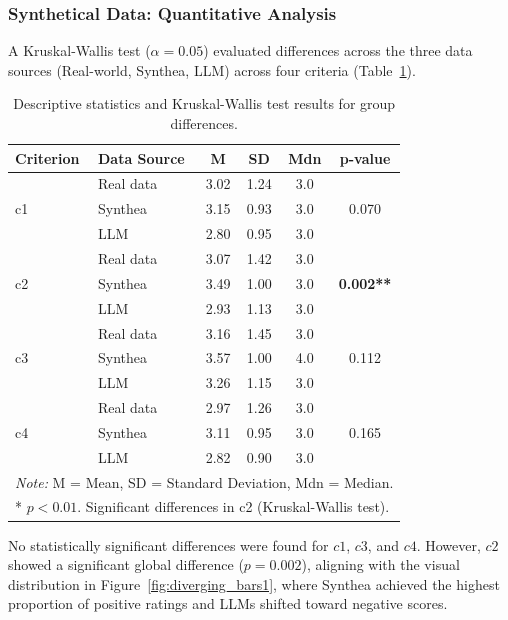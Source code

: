 \subsubsection*{Synthetical Data: Quantitative Analysis}
A Kruskal-Wallis test ($\alpha = 0.05$) evaluated differences across the three data sources (Real-world, Synthea, LLM) across four criteria (Table~\ref{tab:descriptive_stats1}). 
\begin{table}[h!]
\centering
\caption{Descriptive statistics and Kruskal-Wallis test results for group differences.}
\label{tab:descriptive_stats1}
\begin{tabular}{llcccc}
\toprule
\textbf{Criterion} & \textbf{Data Source} & \textbf{M} & \textbf{SD} & \textbf{Mdn} & \textbf{p-value} \\
\midrule
\multirow{3}{*}{c1} & Real data & 3.02 & 1.24 & 3.0 & \multirow{3}{*}{0.070} \\
                    & Synthea    & 3.15 & 0.93 & 3.0 & \\
                    & LLM        & 2.80 & 0.95 & 3.0 & \\
\midrule
\multirow{3}{*}{c2} & Real data & 3.07 & 1.42 & 3.0 & \multirow{3}{*}{\textbf{0.002**}} \\
                    & Synthea    & 3.49 & 1.00 & 3.0 & \\
                    & LLM        & 2.93 & 1.13 & 3.0 & \\
\midrule
\multirow{3}{*}{c3} & Real data & 3.16 & 1.45 & 3.0 & \multirow{3}{*}{0.112} \\
                    & Synthea    & 3.57 & 1.00 & 4.0 & \\
                    & LLM        & 3.26 & 1.15 & 3.0 & \\
\midrule
\multirow{3}{*}{c4} & Real data & 2.97 & 1.26 & 3.0 & \multirow{3}{*}{0.165} \\
                    & Synthea    & 3.11 & 0.95 & 3.0 & \\
                    & LLM        & 2.82 & 0.90 & 3.0 & \\
\bottomrule
\multicolumn{6}{l}{\small \textit{Note:} M = Mean, SD = Standard Deviation, Mdn = Median.} \\
\multicolumn{6}{l}{\small ** $p < 0.01$. Significant differences in c2 (Kruskal-Wallis test).}
\end{tabular}
\end{table}
No statistically significant differences were found for $c1$, $c3$, and $c4$. However, $c2$ showed a significant global difference ($p = 0.002$), aligning with the visual distribution in Figure~\ref{fig:diverging_bars1}, where Synthea achieved the highest proportion of positive ratings and LLMs shifted toward negative scores.
